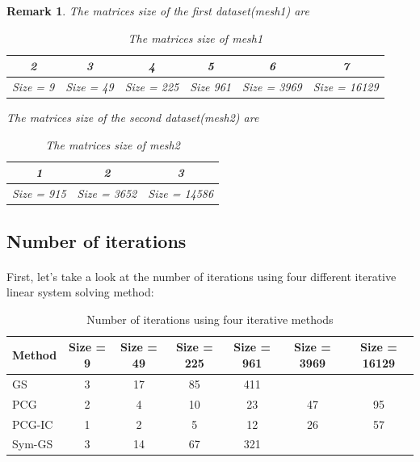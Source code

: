 \documentclass{article}
\newtheorem*{remark}{Remark}
\begin{document}
\newpage
\begin{remark}
The matrices size of the first dataset(mesh1) are 
\begin{table}[h]
\begin{center}
\begin{tabular}{cccccc}

2&3&4&5&6&7\\
\hline
Size = 9 & Size = 49 & Size = 225 & Size 961 & Size = 3969 & Size = 16129\\
\hline
\end{tabular}
\caption{The matrices size of mesh1}
\end{center}
\end{table}

The matrices size of the second dataset(mesh2) are 
\begin{table}[h]
\begin{center}
\begin{tabular}{ccc}

1&2&3\\
\hline
Size = 915 & Size = 3652 & Size = 14586\\
\hline
\end{tabular}
\caption{The matrices size of mesh2}
\end{center}
\end{table}


\end{remark}

\subsection{Number of iterations} 
\paragraph{}
First, let's take a look at the number of iterations using four different iterative linear system solving method:
\begin{table}[h]
\begin{center}
\begin{tabular}{lcccccc}
\hline
Method & Size = 9 & Size = 49 & Size = 225 & Size = 961 & Size = 3969 & Size = 16129\\
\hline
GS & 3 & 17 & 85 & 411 & &\\
PCG & 2 & 4 & 10 & 23 & 47 & 95\\
PCG-IC & 1 & 2 & 5 & 12 & 26 & 57\\
Sym-GS & 3 & 14 & 67 & 321 & &\\
\hline
\end{tabular}
\caption{Number of iterations using four iterative methods}
\end{center}
\end{table}
\end{document}
